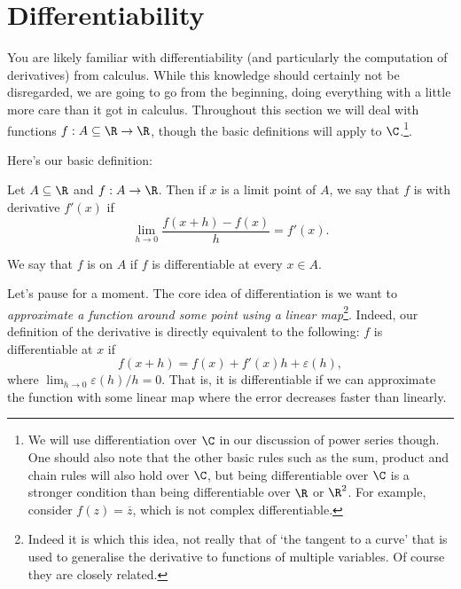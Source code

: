 \section{Differentiability}

You are likely familiar with differentiability (and particularly the computation of derivatives) from calculus. While this knowledge should certainly not be disregarded, we are going to go from the beginning, doing everything with a little more care than it got in calculus.
Throughout this section we will deal with functions $f: A \subseteq \R \rightarrow \R$,
though the basic definitions will apply to $\C$.\footnote{We will use differentiation over $\C$ in our discussion of power series though. One should also note that the other basic rules such as the sum, product and chain rules will also hold over $\C$, but being differentiable over $\C$ is a stronger condition than being differentiable over $\R$ or $\R^2$. For example, consider $f(z) = \overline{z}$, which is not complex differentiable.}.

Here's our basic definition:

\begin{definition}[Differentiability]
	Let $A \subseteq \R$ and $f: A \rightarrow \R$. 
	Then if $x$ is a limit point of $A$, we say that $f$ is  with derivative $f'(x)$ if
	$$
	\lim_{h \to 0} \frac{f(x + h) - f(x)}{h} = f'(x).
	$$

	We say that $f$ is  on $A$ if $f$ is differentiable at every $x \in A$.
\end{definition}

Let's pause for a moment. The core idea of differentiation is 
we want to \emph{approximate a function around some point using a linear map}\footnote{Indeed it is which this idea, not really that of `the tangent to a curve' that is used to generalise the derivative to functions of multiple variables. Of course they are closely related.}. Indeed, our definition of the derivative is directly equivalent to the following: $f$ is differentiable at $x$ if
$$
	f(x + h) = f(x) + f'(x)h + \varepsilon(h),
$$
where $\lim_{h\to 0} \varepsilon(h)/h = 0$. That is, it is differentiable if we can approximate the function with some linear map where the error decreases faster than linearly.



